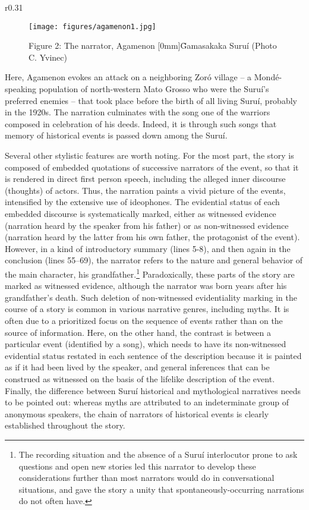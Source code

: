 \documentclass[output=paper,
modfonts,nonflat
]{langsci/langscibook}
\begin{document}
\def\oldIntextsep{\the\intextsep}
\setlength{\intextsep}{0pt}
\begin{wrapfigure}{r}{0.31\textwidth}
  \begin{figure}[H]
  \texttt{[image: figures/agamenon1.jpg]}
  \caption*{Figure 2: The narrator, Agamenon \raisebox{-.02mm}[0mm]{\~{G}}amasakaka Suruí (Photo C. Yvinec)}
  \end{figure}
\end{wrapfigure}
\setlength{\intextsep}{\oldIntextsep}

\addtocounter{figure}{1}

Here, Agamenon evokes an attack on a neighboring Zoró village -- a Mondé-speaking population of north-western Mato Grosso who were the Suruí’s preferred enemies -- that took place before the birth of all living Suruí, probably in the 1920s. The narration culminates with the song one of the warriors composed in celebration of his deeds. Indeed, it is through such songs that memory of historical events is passed down among the Suruí.

\largerpage
Several other stylistic features are worth noting. For the most part, the story is composed of embedded quotations of successive narrators of the event, so that it is rendered in direct first person speech, including the alleged inner discourse (thoughts) of actors. Thus, the narration paints a vivid picture of the events, intensified by the extensive use of ideophones. The evidential status of each embedded discourse is systematically marked, either as witnessed evidence (narration heard by the speaker from his father) or as non-witnessed evidence (narration heard by the latter from his own father, the protagonist of the event). However, in a kind of introductory summary (lines 5-8), and then again in the conclusion (lines 55--69), the narrator refers to the nature and general behavior of the main character, his grandfather.\footnote{The recording situation and the absence of a Suruí interlocutor prone to ask questions and open new stories led this narrator to develop these considerations further than most narrators would do in conversational situations, and gave the story a unity that spontaneously-occurring narrations do not often have.} Paradoxically, these parts of the story are marked as witnessed evidence, although the narrator was born years after his grandfather's death. Such deletion of non-witnessed evidentiality marking in the course of a story is common in various narrative genres, including myths. It is often due to a prioritized focus on the sequence of events rather than on the source of information. Here, on the other hand, the contrast is between a particular event (identified by a song), which needs to have its non-witnessed evidential status restated in each sentence of the description because it is painted as if it had been lived by the speaker, and general inferences that can be construed as witnessed on the basis of the lifelike description of the event. Finally, the difference between Suruí historical and mythological narratives needs to be pointed out: whereas myths are attributed to an indeterminate group of anonymous speakers, the chain of narrators of historical events is clearly established throughout the story.
\end{document}
